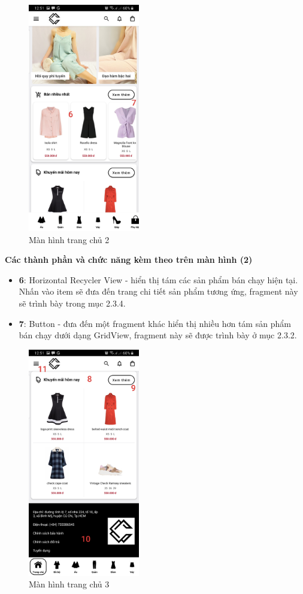 \documentclass[12pt]{article}
\begin{document}
\newpage
\begin{figure}[H]
    \centering
    \includegraphics[height=10cm]{images/12.png}
    \caption{Màn hình trang chủ 2}
\end{figure}

\indent \textbf{Các thành phần và chức năng kèm theo trên màn hình (2)}
\begin{itemize}
    \item \textbf{6}: Horizontal Recycler View - hiển thị tám các sản phẩm bán chạy hiện tại. Nhấn vào item sẽ đưa đến trang chi tiết sản phẩm tương ứng, fragment này sẽ trình bày trong mục 2.3.4.
    \item \textbf{7}: Button - đưa đến một fragment khác hiển thị nhiều hơn tám sản phẩm bán chạy dưới dạng GridView, fragment này sẽ được trình bày ở mục 2.3.2.
\end{itemize}

\newpage
\begin{figure}[H]
    \centering
    \includegraphics[height=10cm]{images/13.png}
    \caption{Màn hình trang chủ 3}
\end{figure}
\end{document}
